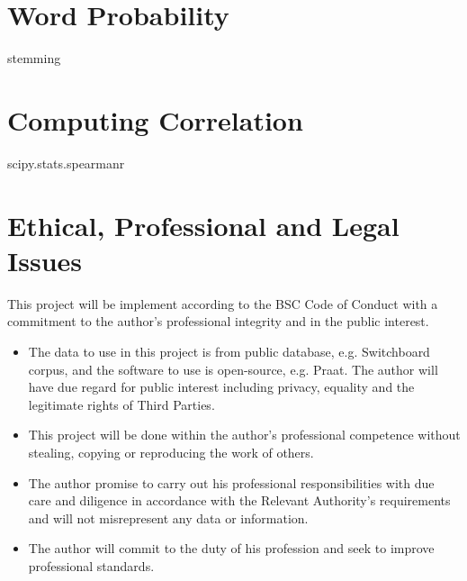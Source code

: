 \section{Word Probability}
stemming

\section{Computing Correlation}
scipy.stats.spearmanr



\section{Ethical, Professional and Legal Issues}
This project will be implement according to the BSC Code of Conduct with a commitment to the author's professional integrity and in the public interest.

\begin{itemize}
    
    \item The data to use in this project is from public database, e.g. Switchboard corpus, and the software to use is open-source, e.g. Praat. The author will have due regard for public interest including privacy, equality and  the legitimate rights of Third Parties.
    
    \item This project will be done within the author's professional competence without stealing, copying or reproducing the work of others.
    
    \item The author promise to carry out his professional responsibilities with due care and
    diligence in accordance with the Relevant Authority’s requirements and will not misrepresent any data or information.
    
    \item The author will commit to the duty of his profession and seek to improve professional standards.
\end{itemize}




